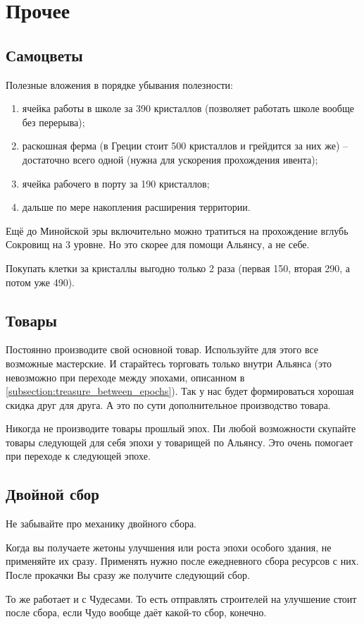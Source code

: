 \section{Прочее}

\subsection{Самоцветы}

Полезные вложения в порядке убывания полезности:
\begin{enumerate}
    \item ячейка работы в школе за 390 кристаллов (позволяет работать школе вообще без перерыва);    
    \item раскошная ферма (в Греции стоит 500 кристаллов и грейдится за них же) -- достаточно всего одной (нужна для ускорения прохождения ивента);
    \item ячейка рабочего в порту за 190 кристаллов;
    \item дальше по мере накопления расширения территории.
\end{enumerate}
Ещё до Минойской эры включительно можно тратиться на прохождение вглубь Сокровищ на 3 уровне. Но это скорее для помощи Альянсу, а не себе. 

Покупать клетки за кристаллы выгодно только 2 раза (первая 150, вторая 290, а потом уже 490).

\subsection{Товары}

Постоянно производите свой основной товар.
Используйте для этого все возможные мастерские.
И старайтесь торговать только внутри Альянса (это невозможно при переходе между эпохами, описанном в \ref{subsection:treasure_between_epochs}).
Так у нас будет формироваться хорошая скидка друг для друга.
А это по сути дополнительное производство товара.

Никогда не производите товары прошлый эпох.
Пи любой возможности скупайте товары следующей для себя эпохи у товарищей по Альянсу.
Это очень помогает при переходе к следующей эпохе.

\subsection{Двойной сбор}

Не забывайте про механику двойного сбора.

Когда вы получаете жетоны улучшения или роста эпохи особого здания, не применяйте их сразу.
Применять нужно после ежедневного сбора ресурсов с них.
После прокачки Вы сразу же получите следующий сбор.

То же работает и с Чудесами. 
То есть отправлять строителей на улучшение стоит после сбора, если Чудо вообще даёт какой-то сбор, конечно.
